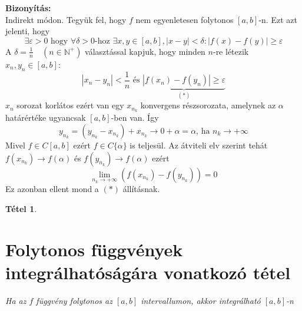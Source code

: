 \documentclass{article}
\newtheorem{theorem}{Tétel}
\renewenvironment{proof}{\textbf{Bizonyítás:} \\}{\hfill}
\begin{document}
\begin{proof}
Indirekt módon. Tegyük fel, hogy $f$ nem egyenletesen folytonos $[a,b]$-n. Ezt azt jelenti, hogy
\begin{equation*}
    \exists \varepsilon > 0\textrm{ hogy }\forall \delta > 0\textrm{-hoz }\exists x,y\in [a,b], |x-y| < \delta: |f(x)-f(y)| \geq \varepsilon 
\end{equation*}
A $\delta=\frac{1}{n}\quad (n\in\mathbb{N}^+)$ választással kapjuk, hogy minden $n$-re létezik $x_n,y_n\in[a,b]$:
\begin{equation*}
    |x_n-y_n|<\frac{1}{n}\textrm{ és }\underbrace{|f(x_n)-f(y_n)|\geq \varepsilon}_{(*)}
\end{equation*}
$x_n$ sorozat korlátos ezért van egy $x_{n_k}$ konvergens részsorozata, amelynek az $\alpha$ határértéke ugyancsak $[a,b]$-ben van. Így
\begin{equation*}
    y_{n_k}=\left(y_{n_k}-x_{n_k}\right)+x_{n_k}\to 0+\alpha=\alpha\textrm{, ha }n_k\to + \infty
\end{equation*}
Mivel $f\in C[a,b]$ ezért $f\in C\{\alpha\}$ is teljesül. Az átviteli elv szerint tehát $f(x_{n_k})\to f(\alpha)$ és $f(y_{n_k})\to f(\alpha)$ ezért
\begin{equation*}
    \lim_{n_k\to+\infty}(f(x_{n_k}) - f(y_{n_k})) = 0
\end{equation*}
Ez azonban ellent mond a $(*)$ állításnak.
\end{proof}
\newpage
\begin{theorem}
\section{Folytonos függvények integrálhatóságára vonatkozó tétel} 
Ha az $f$ függvény folytonos az $[a,b]$ intervallumon, akkor integrálható $[a,b]$-n
\end{theorem}
\end{document}
